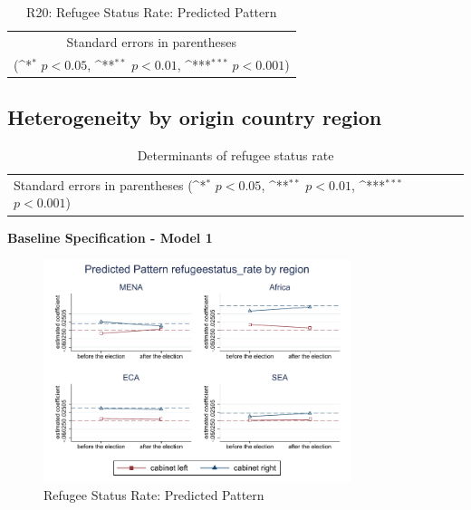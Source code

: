 \documentclass[10pt,a4paper]{scrartcl}
\begin{document}
\begin{table}[!ht]\centering
	\footnotesize
	\renewcommand{\arraystretch}{1.2}
	\def\sym#1{\ifmmode^{#1}\else\(^{#1}\)\fi}
	\caption{R20: Refugee Status Rate: Predicted Pattern}
	\begin{tabular}{l*{2}{c}}
		\hline\hline
		
		\hline\hline
		\multicolumn{3}{c}{\footnotesize Standard errors in parentheses} \\
		\multicolumn{3}{c}{\footnotesize (\sym{*} \(p<0.05\), \sym{**} \(p<0.01\), \sym{***} \(p<0.001\))} \\
	\end{tabular}
\end{table}


\clearpage
\FloatBarrier
\subsection{Heterogeneity by origin country region}
\begin{table}[!ht]\centering
	\renewcommand{\arraystretch}{1.25}
	\small
	\def\sym#1{\ifmmode^{#1}\else\(^{#1}\)\fi}
	\caption{Determinants of refugee status rate}
	\begin{tabular}{l*{4}{c}}
		\hline\hline
		
		\hline\hline
		\multicolumn{5}{l}{\footnotesize Standard errors in parentheses (\sym{*} \(p<0.05\), \sym{**} \(p<0.01\), \sym{***} \(p<0.001\))}\\
	\end{tabular}
\end{table}

\clearpage
\textbf{Baseline Specification - Model 1}
\begin{figure}[!ht]
	\centering
	\includegraphics[width=0.8\textwidth]{figures_edited/refugeestatus_rate_graph1_by_region.pdf}
	\caption{Refugee Status Rate: Predicted Pattern}
\end{figure}
\end{document}

